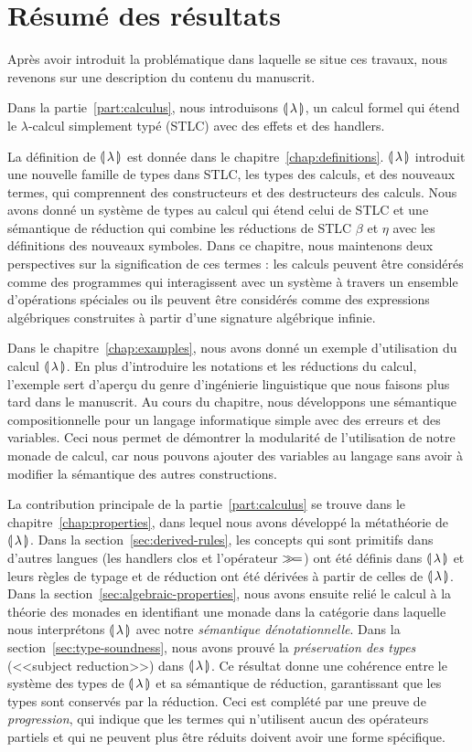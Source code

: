 \section*{Résumé des résultats}
\label{sec:french-summary-of-results}

Après avoir introduit la problématique dans laquelle se situe
ces travaux, nous revenons sur une description du contenu du manuscrit.

Dans la partie~\ref{part:calculus}, nous introduisons ${\llparenthesis \, \lambda \, \rrparenthesis}$, un calcul
formel qui étend le $\lambda$-calcul simplement typé (STLC) avec des effets et
des handlers.

La définition de ${\llparenthesis \, \lambda \, \rrparenthesis}$ est donnée dans le chapitre~\ref{chap:definitions}.
${\llparenthesis \, \lambda \, \rrparenthesis}$ introduit une nouvelle famille de types dans STLC, les types des
calculs, et des nouveaux termes, qui comprennent des constructeurs et des
destructeurs des calculs. Nous avons donné un système de types au calcul qui
étend celui de STLC et une sémantique de réduction qui combine les réductions de
STLC $\beta$ et $\eta$ avec les définitions des nouveaux symboles. Dans ce
chapitre, nous maintenons deux perspectives sur la signification de ces termes :
les calculs peuvent être considérés comme des programmes qui interagissent avec
un système à travers un ensemble d'opérations spéciales ou ils peuvent être
considérés comme des expressions algébriques construites à partir d'une signature
algébrique infinie.

Dans le chapitre~\ref{chap:examples}, nous avons donné un exemple d'utilisation
du calcul ${\llparenthesis \, \lambda \, \rrparenthesis}$. En plus d'introduire les notations et les
réductions du calcul, l'exemple sert d'aperçu du genre d'ingénierie
linguistique que nous faisons plus tard dans le manuscrit. Au cours du chapitre,
nous développons une sémantique compositionnelle pour un langage
informatique simple avec des erreurs et des variables. Ceci nous permet de
démontrer la modularité de l'utilisation de notre monade de calcul, car nous
pouvons ajouter des variables au langage sans avoir à modifier la sémantique
des autres constructions.

La contribution principale de la partie~\ref{part:calculus} se trouve dans le
chapitre~\ref{chap:properties}, dans lequel nous avons développé la métathéorie
de ${\llparenthesis \, \lambda \, \rrparenthesis}$. Dans la section~\ref{sec:derived-rules}, les concepts qui sont
primitifs dans d'autres langues (les handlers clos et l'opérateur $\mathbin{\gg\!=}$) ont
été définis dans ${\llparenthesis \, \lambda \, \rrparenthesis}$ et leurs règles de typage et de réduction ont été
dérivées à partir de celles de ${\llparenthesis \, \lambda \, \rrparenthesis}$. Dans la
section~\ref{sec:algebraic-properties}, nous avons ensuite relié le calcul à la
théorie des monades en identifiant une monade dans la catégorie dans laquelle
nous interprétons ${\llparenthesis \, \lambda \, \rrparenthesis}$ avec notre \emph{sémantique dénotationnelle}. Dans la
section~\ref{sec:type-soundness}, nous avons prouvé la \emph{préservation des
  types} (<<subject reduction>>) dans ${\llparenthesis \, \lambda \, \rrparenthesis}$. Ce résultat donne une cohérence
entre le système des types de ${\llparenthesis \, \lambda \, \rrparenthesis}$ et sa sémantique de réduction,
garantissant que les types sont conservés par la réduction. Ceci est complété par
une preuve de \emph{progression}, qui indique que les termes qui n'utilisent
aucun des opérateurs partiels et qui ne peuvent plus être réduits doivent avoir
une forme spécifique.

